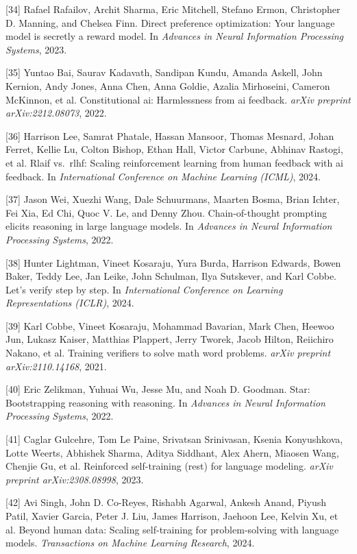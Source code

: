\documentclass{article}
\begin{document}
[34] Rafael Rafailov, Archit Sharma, Eric Mitchell, Stefano
Ermon, Christopher D. Manning, and Chelsea Finn. Direct
preference optimization: Your language model is secretly a
reward model. In \textit{Advances in Neural Information
Processing Systems}, 2023.

[35] Yuntao Bai, Saurav Kadavath, Sandipan Kundu, Amanda Askell,
John Kernion, Andy Jones, Anna Chen, Anna Goldie, Azalia
Mirhoseini, Cameron McKinnon, et al. Constitutional ai:
Harmlessness from ai feedback.
\textit{arXiv preprint arXiv:2212.08073}, 2022.

[36] Harrison Lee, Samrat Phatale, Hassan Mansoor, Thomas
Mesnard, Johan Ferret, Kellie Lu, Colton Bishop, Ethan Hall,
Victor Carbune, Abhinav Rastogi, et al. Rlaif vs.\ rlhf: Scaling
reinforcement learning from human feedback with ai feedback. In
\textit{International Conference on Machine Learning (ICML)},
2024.

[37] Jason Wei, Xuezhi Wang, Dale Schuurmans, Maarten Bosma,
Brian Ichter, Fei Xia, Ed Chi, Quoc V. Le, and Denny Zhou.
Chain-of-thought prompting elicits reasoning in large language
models. In \textit{Advances in Neural Information Processing
Systems}, 2022.

[38] Hunter Lightman, Vineet Kosaraju, Yura Burda, Harrison
Edwards, Bowen Baker, Teddy Lee, Jan Leike, John Schulman, Ilya
Sutskever, and Karl Cobbe. Let's verify step by step. In
\textit{International Conference on Learning Representations
(ICLR)}, 2024.

[39] Karl Cobbe, Vineet Kosaraju, Mohammad Bavarian, Mark Chen,
Heewoo Jun, Lukasz Kaiser, Matthias Plappert, Jerry Tworek, Jacob
Hilton, Reiichiro Nakano, et al. Training verifiers to solve math
word problems. \textit{arXiv preprint arXiv:2110.14168}, 2021.

[40] Eric Zelikman, Yuhuai Wu, Jesse Mu, and Noah D. Goodman.
Star: Bootstrapping reasoning with reasoning. In \textit{Advances
in Neural Information Processing Systems}, 2022.

[41] Caglar Gulcehre, Tom Le Paine, Srivatsan Srinivasan, Ksenia
Konyushkova, Lotte Weerts, Abhishek Sharma, Aditya Siddhant,
Alex Ahern, Miaosen Wang, Chenjie Gu, et al. Reinforced
self-training (rest) for language modeling.
\textit{arXiv preprint arXiv:2308.08998}, 2023.

[42] Avi Singh, John D. Co-Reyes, Rishabh Agarwal, Ankesh Anand,
Piyush Patil, Xavier Garcia, Peter J. Liu, James Harrison, Jaehoon
Lee, Kelvin Xu, et al. Beyond human data: Scaling self-training
for problem-solving with language models. \textit{Transactions on
Machine Learning Research}, 2024.
\end{document}
